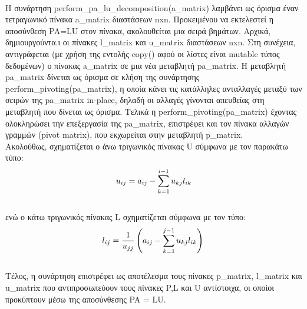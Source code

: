 \documentclass[a4paper,11pt]{article}
\newcommand{\lt}{\latintext}
\begin{document}
\\Η συνάρτηση {\lt perform\_pa\_lu\_decomposition(a\_matrix)} λαμβάνει ως όρισμα έναν τετραγωνικό πίνακα {\lt a\_matrix} διαστάσεων {\lt nxn}. Προκειμένου να εκτελεστεί η αποσύνθεση {\lt PA=LU} στον πίνακα, ακολουθείται μια σειρά βημάτων. Αρχικά, δημιουργούντα.ι οι πίνακες {\lt l\_matrix} και {\lt u\_matrix} διαστάσεων {\lt nxn}. Στη συνέχεια, αντιγράφεται (με χρήση της εντολής {\lt copy()} αφού οι λίστες είναι {\lt mutable} τύπος δεδομένων) ο πίνακας  {\lt a\_matrix} σε μια νέα μεταβλητή {\lt pa\_matrix}. Η μεταβλητή {\lt pa\_matrix} δίνεται ως όρισμα σε κλήση της συνάρτησης  {\lt perform\_pivoting(pa\_matrix)}, η οποία κάνει τις κατάλληλες ανταλλαγές μεταξύ των σειρών της {\lt pa\_matrix} {\lt in-place}, δηλαδή οι αλλαγές γίνονται απευθείας στη μεταβλητή που δίνεται ως όρισμα. Τελικά η {\lt perform\_pivoting(pa\_matrix)} έχοντας ολοκληρώσει την επεξεργασία της {\lt pa\_matrix}, επιστρέφει και τον πίνακα αλλαγών γραμμών {\lt (pivot matrix)}, που εκχωρείται στην μεταβλητή {\lt p\_matrix}.\\
Ακολούθως, σχηματίζεται ο άνω τριγωνικός πίνακας {\lt U} σύμφωνα με τον παρακάτω τύπο:\\
\begin{equation*}
\\u_{ij} = a_{ij} - \sum_{k=1}^{i-1} u_{kj} l_{ik}\\
\end{equation*}
\\ενώ ο κάτω τριγωνικός πίνακας {\lt L} σχηματίζεται σύμφωνα με τον τύπο:\\
\begin{equation*}
\\l_{ij} = \frac{1}{u_{jj}} \left(a_{ij} - \sum_{k=1}^{j-1} u_{kj} l_{ik} \right)\\
\end{equation*}
\\Τέλος, η συνάρτηση επιστρέφει ως αποτέλεσμα τους πίνακες {\lt p\_matrix}, {\lt l\_matrix} και {\lt u\_matrix} που αντιπροσωπεύουν τους πίνακες {\lt P},{\lt L} και {\lt U} αντίστοιχα, οι οποίοι προκύπτουν μέσω της αποσύνθεσης {\lt PA = LU}.
\end{document}
